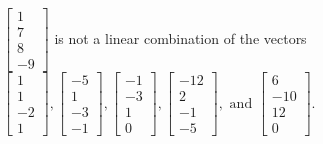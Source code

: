 \begin{exercise}
\begin{exerciseStatement}
  \end{exerciseStatement}
  \begin{exerciseAnswer}
   \(\left[\begin{array}{c}
1 \\
7 \\
8 \\
-9
\end{array}\right]\) 
  	 is not  
	a linear combination of the vectors \(\left[\begin{array}{c}
1 \\
1 \\
-2 \\
1
\end{array}\right] , \left[\begin{array}{c}
-5 \\
1 \\
-3 \\
-1
\end{array}\right] , \left[\begin{array}{c}
-1 \\
-3 \\
1 \\
0
\end{array}\right] , \left[\begin{array}{c}
-12 \\
2 \\
-1 \\
-5
\end{array}\right] , \text{ and } \left[\begin{array}{c}
6 \\
-10 \\
12 \\
0
\end{array}\right]\).

	
  


  \end{exerciseAnswer}
\end{exercise}
